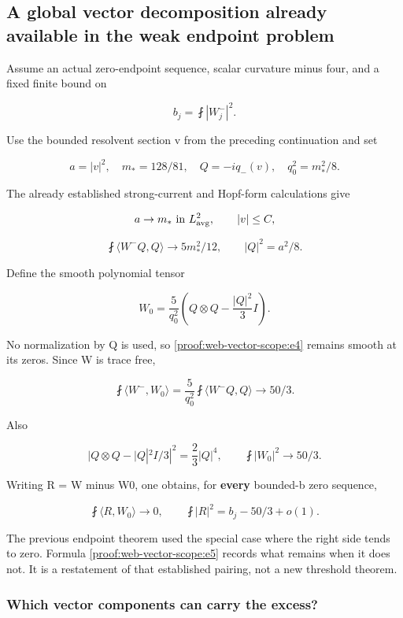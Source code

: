 \hypertarget{proof:web-vector-scope:s4}{%
\subsection{A global vector decomposition already available in the weak endpoint problem}\label{proof:web-vector-scope:s4}}

Assume an actual zero-endpoint sequence, scalar curvature minus four, and a fixed finite bound on

\[
 b_j=\fint|W_j^-|^2.
\]

Use the bounded resolvent section v from the preceding continuation and set

\[
 a=|v|^2,\quad m_*=128/81,\quad Q=-iq_-(v),\quad q_0^2=m_*^2/8.
\]

The already established strong-current and Hopf-form calculations give

\[
 a\to m_*\text{ in }L^2_{\rm avg},\qquad |v|\le C,
\]

\[
 \fint\langle W^-Q,Q\rangle\to5m_*^2/12,
 \qquad |Q|^2=a^2/8.
\tag{\thesection.3}\label{proof:web-vector-scope:e3}
\]

Define the smooth polynomial tensor

\[
 W_0=\frac5{q_0^2}
 \left(Q\otimes Q-\frac{|Q|^2}{3}I\right).
\tag{\thesection.4}\label{proof:web-vector-scope:e4}
\]

No normalization by Q is used, so \eqref{proof:web-vector-scope:e4} remains smooth at its zeros. Since W is trace free,

\[
 \fint\langle W^-,W_0\rangle
 =\frac5{q_0^2}\fint\langle W^-Q,Q\rangle\to50/3.
\]

Also

\[
 |Q\otimes Q-|Q|^2I/3|^2=\frac23|Q|^4,
 \qquad \fint|W_0|^2\to50/3.
\]

Writing R = W minus W0, one obtains, for \textbf{every} bounded-b zero sequence,

\[
 \boxed{\fint\langle R,W_0\rangle\to0,
 \qquad \fint|R|^2=b_j-50/3+o(1).}
\tag{\thesection.5}\label{proof:web-vector-scope:e5}
\]

The previous endpoint theorem used the special case where the right side tends to zero. Formula \eqref{proof:web-vector-scope:e5} records what remains when it does not. It is a restatement of that established pairing, not a new threshold theorem.

\hypertarget{proof:web-vector-scope:s4.1}{%
\subsubsection{Which vector components can carry the excess?}\label{proof:web-vector-scope:s4.1}}
